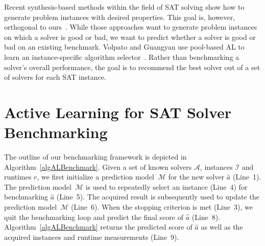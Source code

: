 \documentclass[runningheads]{llncs}
\begin{document}
Recent synthesis-based methods within the field of SAT solving show how to generate problem instances with desired properties.
This goal is, however, orthogonal to ours~\cite{0001AEMN22,GarzonMG22}.
While those approaches want to generate problem instances on which a solver is good or bad, we want to predict whether a solver is good or bad on an existing benchmark.
Volpato and Guangyan use pool-based AL to learn an instance-specific algorithm selector~\cite{volpato2019active}.
Rather than benchmarking a solver's overall performance, the goal is to recommend the best solver out of a set of solvers for each SAT instance.



\section{Active Learning for SAT Solver Benchmarking}
\label{sec:main}

The outline of our benchmarking framework is depicted in Algorithm~\ref{algALBenchmark}. 
Given a set of known solvers $\mathcal{A}$, instances $\mathcal{I}$ and runtimes $r$, we first initialize a prediction model~$\mathcal{M}$ for the new solver $\hat a$ (Line~1). 
The prediction model~$\mathcal{M}$ is used to repeatedly select an instance (Line~4) for benchmarking $\hat a$ (Line~5). 
The acquired result is subsequently used to update the prediction model~$\mathcal{M}$ (Line~6). 
When the stopping criterion is met (Line~3), we quit the benchmarking loop and predict the final score of $\hat a$ (Line~8). 
Algorithm~\ref{algALBenchmark} returns the predicted score of $\hat a$ as well as the acquired instances and runtime measurements (Line~9). 
\end{document}
